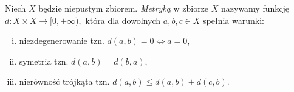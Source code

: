 {\begin{definition}
    \end{definition}
    \begin{definition}[Metryka]
        \label{def:metric}
        Niech $X$ będzie niepustym zbiorem. \emph{Metryką} w zbiorze $X$ nazywamy funkcję $d\colon X\times X\rightarrow [0, +\infty),$ która dla dowolnych $a, b, c\in X$ spełnia warunki:
        \begin{enumerate}[(i)]
            \item niezdegenerowanie tzn. $d(a, b) = 0 \iff a = 0$,
            \item symetria tzn. $d(a, b) = d(b, a),$
            \item nierówność trójkąta tzn. $d(a, b) \leq d(a, b) + d(c, b)$.
        \end{enumerate}            
    \end{definition}
}
